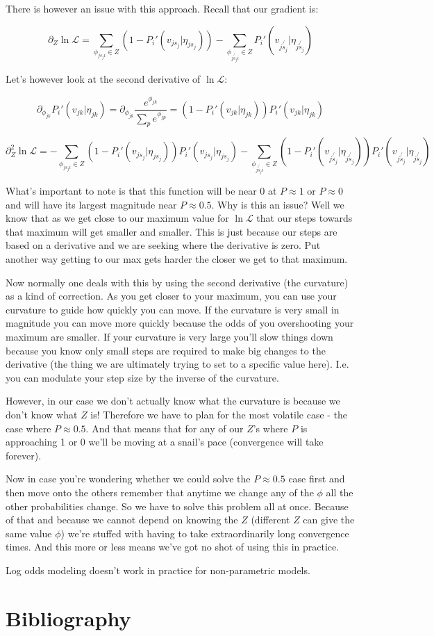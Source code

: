 \documentclass[11pt]{article}
\begin{document}
There is however an issue with this approach. Recall that our gradient is:

$$\partial_Z \ln{\mathcal{L}}=\sum_{\phi_{js_ji} \in Z}\left(1-P_i'(v_{js_j} | \eta_{js_j}) \right)-\sum_{\phi_{j\not{s_j}i}\in Z}P_i'(v_{j\not{s_j}} | \eta_{j\not{s_j}})$$

Let's however look at the second derivative of $\ln{\mathcal{L}}$:

$$\partial_{\phi_{jk}} P_i'(v_{jk} | \eta_{jk})=\partial_{\phi_{jk}} \frac{e^{\phi_{jk}}}{\sum_p e^{\phi_{jp}}}=(1-P_i'(v_{jk} | \eta_{jk}))P_i'(v_{jk} | \eta_{jk})$$


$$\partial^2_Z \ln{\mathcal{L}}=-\sum_{\phi_{js_ji} \in Z}\left(1-P_i'(v_{js_j} | \eta_{js_j}) \right)P_i'(v_{js_j} | \eta_{js_j})-\sum_{\phi_{j\not{s_j}i}\in Z}\left(1-P_i'(v_{j\not{s_j}} | \eta_{j\not{s_j}}) \right)P_i'(v_{j\not{s_j}} | \eta_{j\not{s_j}})$$

What's important to note is that this function will be near 0 at $P\approx 1$ or $P\approx 0$ and will have its largest magnitude near $P \approx 0.5$. Why is this an issue? Well we know that as we get close to our maximum value for $\ln{\mathcal{L}}$ that our steps towards that maximum will get smaller and smaller. This is just because our steps are based on a derivative and we are seeking where the derivative is zero. Put another way getting to our max gets harder the closer we get to that maximum. 

Now normally one deals with this by using the second derivative (the curvature) as a kind of correction. As you get closer to your maximum, you can use your curvature to guide how quickly you can move. If the curvature is very small in magnitude you can move more quickly because the odds of you overshooting your maximum are smaller. If your curvature is very large you'll slow things down because you know only small steps are required to make big changes to the derivative (the thing we are ultimately trying to set to a specific value here). I.e. you can modulate your step size by the inverse of the curvature. 

However, in our case we don't actually know what the curvature is because we don't know what $Z$ is! Therefore we have to plan for the most volatile case - the case where $P\approx 0.5$. And that means that for any of our $Z$'s where $P$ is approaching 1 or 0 we'll be moving at a snail's pace (convergence will take forever). 

Now in case you're wondering whether we could solve the $P\approx 0.5$ case first and then move onto the others remember that anytime we change any of the $\phi$ all the other probabilities change. So we have to solve this problem all at once. Because of that and because we cannot depend on knowing the $Z$ (different $Z$ can give the same value $\phi$) we're stuffed with having to take extraordinarily long convergence times. And this more or less means we've got no shot of using this in practice. \newline

Log odds modeling doesn't work in practice for non-parametric models. 


\newpage

\section{Bibliography}



\end{document}
